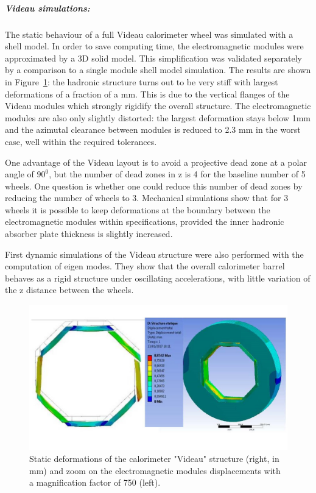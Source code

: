 \subparagraph{\textbf{Videau simulations:}} The static behaviour of a full Videau calorimeter wheel was simulated with a shell model. In order to save computing time, the electromagnetic modules were approximated by a 3D solid model. This simplification was validated separately by a comparison to a single module shell model simulation. The results are shown in Figure~\ref{fig:integration:Videau_deformations}: the hadronic structure turns out to be very stiff with largest deformations of a fraction of a mm. This is due to the vertical flanges of the Videau modules which strongly rigidify the overall structure. The electromagnetic modules are also only slightly distorted: the largest deformation stays below 1mm and the azimutal clearance between modules is reduced to 2.3 mm in the worst case, well within the required tolerances. 

One advantage of the Videau layout is to avoid a projective dead zone at a polar angle of $90^0$, but the number of dead zones in z is 4 for the baseline number of 5 wheels. One question is whether one could reduce this number of dead zones by reducing the number of wheels to 3. Mechanical simulations show that for 3 wheels it is possible to keep deformations at the boundary between the electromagnetic modules within specifications, provided the inner hadronic absorber plate thickness is slightly increased.

First dynamic simulations of the Videau structure were also performed with the computation of eigen modes. They show that the overall calorimeter barrel behaves as a rigid structure under oscillating accelerations, with little variation of the z distance between the wheels. 


\begin{figure}[t!]
\centering
\includegraphics[width=1.0\hsize]{Integration/fig/Videau_deformations.jpg}
\caption{\label{fig:integration:Videau_deformations}Static deformations of the calorimeter "Videau" structure (right, in mm) and zoom on the electromagnetic modules displacements with a magnification factor of 750 (left).}
\end{figure}

